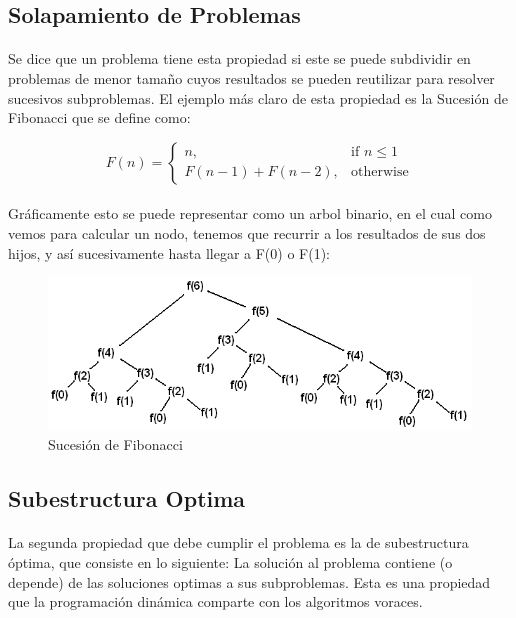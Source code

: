 \documentclass{article}
\begin{document}
	\subsection{Solapamiento de Problemas}
		\paragraph{}
		Se dice que un problema tiene esta propiedad si este se puede subdividir en problemas de menor tamaño cuyos resultados se pueden reutilizar para resolver sucesivos subproblemas. El ejemplo más claro de esta propiedad es la Sucesión de Fibonacci que se define como:
	
		\[
   		 F(n)= 
			\begin{cases}
    				n,				& \text{if } n\leq 1\\
    				F(n-1)+F(n-2),		& \text{otherwise}
			\end{cases}
		\]
		
		\paragraph{}
		Gráficamente esto se puede representar como un arbol binario, en el cual como vemos para calcular un nodo, tenemos que recurrir a los resultados de sus dos hijos, y así sucesivamente hasta llegar a F(0) o F(1):
		
		\begin{figure}[H]
				\centering
				\includegraphics[width=120mm]{../res/fibonacci-sequence.png}
				\caption{Sucesión de Fibonacci \label{example_border}}
		\end{figure}

	\subsection{Subestructura Optima}
		\paragraph{}
		La segunda propiedad que debe cumplir el problema es la de subestructura óptima, que consiste en lo siguiente: La solución al problema contiene (o depende) de las soluciones optimas a sus subproblemas. Esta es una propiedad que la programación dinámica comparte con los algoritmos voraces.
		
\end{document}

